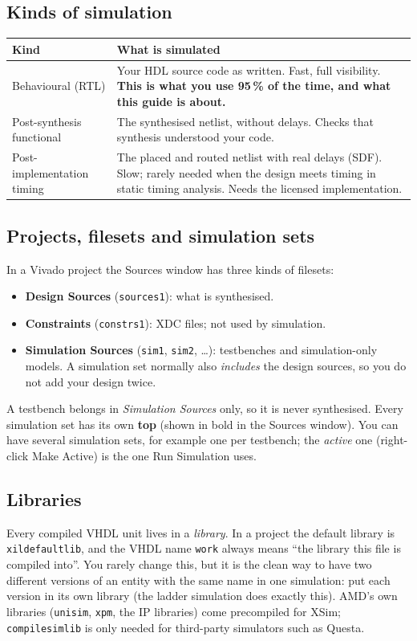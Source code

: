 \documentclass[11pt,a4paper]{article}
\newcommand{\code}[1]{\texttt{#1}}
\renewcommand{\_}{\oldunderscore\allowbreak{}}
\newcommand{\menu}[1]{\textsf{#1}}
\begin{document}
\subsection{Kinds of simulation}
\begin{tabularx}{\textwidth}{@{}lY@{}}
\toprule
\textbf{Kind} & \textbf{What is simulated} \\
\midrule
Behavioural (RTL) & Your HDL source code as written. Fast, full visibility. \textbf{This is what you use 95\,\% of the time, and what this guide is about.} \\
Post-synthesis functional & The synthesised netlist, without delays. Checks that synthesis understood your code. \\
Post-implementation timing & The placed and routed netlist with real delays (SDF). Slow; rarely needed when the design meets timing in static timing analysis. Needs the licensed implementation. \\
\bottomrule
\end{tabularx}

\subsection{Projects, filesets and simulation sets}
In a Vivado project the Sources window has three kinds of filesets:
\begin{itemize}[nosep]
  \item \textbf{Design Sources} (\code{sources\_1}): what is synthesised.
  \item \textbf{Constraints} (\code{constrs\_1}): XDC files; not used by simulation.
  \item \textbf{Simulation Sources} (\code{sim\_1}, \code{sim\_2}, \ldots): testbenches and simulation-only models. A simulation set normally also \emph{includes} the design sources, so you do not add your design twice.
\end{itemize}
A testbench belongs in \emph{Simulation Sources} only, so it is never synthesised. Every simulation set has its own \textbf{top} (shown in bold in the Sources window). You can have several simulation sets, for example one per testbench; the \emph{active} one (right-click \menu{Make Active}) is the one \menu{Run Simulation} uses.

\subsection{Libraries}
Every compiled VHDL unit lives in a \emph{library}. In a project the default library is \code{xil\_defaultlib}, and the VHDL name \code{work} always means ``the library this file is compiled into''. You rarely change this, but it is the clean way to have two different versions of an entity with the same name in one simulation: put each version in its own library (the ladder simulation does exactly this). AMD's own libraries (\code{unisim}, \code{xpm}, the IP libraries) come precompiled for XSim; \code{compile\_simlib} is only needed for third-party simulators such as Questa.
\end{document}
